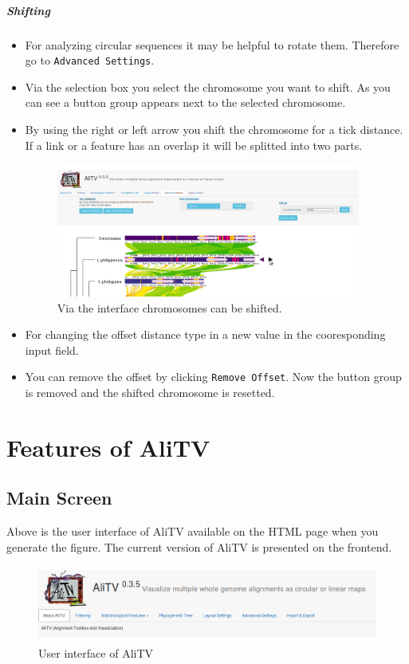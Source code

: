 \documentclass[a4paper]{scrartcl}
\begin{document}
\subparagraph*{Shifting}
\begin{itemize}
	\item For analyzing circular sequences it may be helpful to rotate them. Therefore go to \texttt{Advanced Settings}.
	\item Via the selection box you select the chromosome you want to shift. As you can see a button group appears next to the selected chromosome.
	\item By using the right or left arrow you shift the chromosome for a tick distance. If a link or a feature has an overlap it will be splitted into two parts.
	
	\begin{figure}[H]
		\centering
		\includegraphics[width=10cm]{shift.png}
		\caption{Via the interface chromosomes can be shifted.}
	\end{figure}	
	
	\item For changing the offset distance type in a new value in the cooresponding input field.
	\item You can remove the offset by clicking \texttt{Remove Offset}. Now the button group is removed and the shifted chromosome is resetted.
	
\end{itemize}

\newpage
\section*{Features of AliTV}
\subsection*{Main Screen}
Above is the user interface of AliTV available on the HTML page when you generate the figure. The current version of AliTV is presented on the frontend.
\begin{figure}[H]
	\centering
	\includegraphics[width=14cm]{userInterface.png}
	\caption{User interface of AliTV}
\end{figure}
\end{document}
